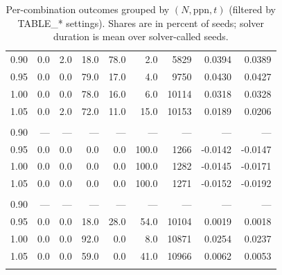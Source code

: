 \begin{table}[t]
\begin{tabular}{r r r r r r r r r}
\midrule
0.90 & 0.0 & 2.0 & 18.0 & 78.0 & 2.0 & 5829 & 0.0394 & 0.0389 \\
0.95 & 0.0 & 0.0 & 79.0 & 17.0 & 4.0 & 9750 & 0.0430 & 0.0427 \\
1.00 & 0.0 & 0.0 & 78.0 & 16.0 & 6.0 & 10114 & 0.0318 & 0.0328 \\
1.05 & 0.0 & 2.0 & 72.0 & 11.0 & 15.0 & 10153 & 0.0189 & 0.0206 \\
\addlinespace[0.35em]
\multicolumn{9}{l}{$N=32$, $\mathrm{ppn}=8$, $t=1\,\mathrm{s}$} \\
\midrule
0.90 & — & — & — & — & — & — & — & — \\
0.95 & 0.0 & 0.0 & 0.0 & 0.0 & 100.0 & 1266 & -0.0142 & -0.0147 \\
1.00 & 0.0 & 0.0 & 0.0 & 0.0 & 100.0 & 1282 & -0.0145 & -0.0171 \\
1.05 & 0.0 & 0.0 & 0.0 & 0.0 & 100.0 & 1271 & -0.0152 & -0.0192 \\
\addlinespace[0.35em]
\multicolumn{9}{l}{$N=32$, $\mathrm{ppn}=8$, $t=10\,\mathrm{s}$} \\
\midrule
0.90 & — & — & — & — & — & — & — & — \\
0.95 & 0.0 & 0.0 & 18.0 & 28.0 & 54.0 & 10104 & 0.0019 & 0.0018 \\
1.00 & 0.0 & 0.0 & 92.0 & 0.0 & 8.0 & 10871 & 0.0254 & 0.0237 \\
1.05 & 0.0 & 0.0 & 59.0 & 0.0 & 41.0 & 10966 & 0.0062 & 0.0053 \\
\addlinespace[0.35em]
\bottomrule
\end{tabular}
\caption{Per-combination outcomes grouped by $(N,\mathrm{ppn},t)$ (filtered by TABLE\_* settings). Shares are in percent of seeds; solver duration is mean over solver-called seeds.}
\label{tab:kwok-workload-once-kmax4}
\end{table}

